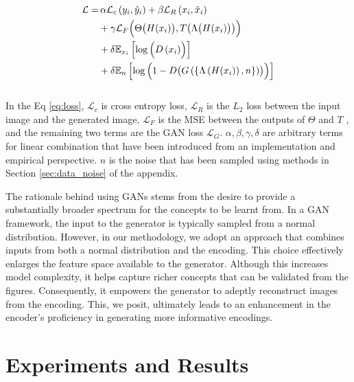 \documentclass[letterpaper]{article}
\begin{document}
\begin{equation}
\begin{aligned}\label{eq:loss}
    \mathcal{L} = & \, \alpha\mathcal{L}_c\left(y_i, \hat{y}_i\right) + \beta \mathcal{L}_R\left(x_i, \hat{x}_i\right)\\
    &+ \gamma \mathcal{L}_F\Bigl(\Theta\bigl(H(x_i)\bigr), T\bigl(\Lambda\bigl(H(x_i)\bigr)\bigr)\Bigr) \\
    & + \delta\mathbb{E}_{x_i}\left[\log\,\Bigl(D\left(x_i\right)\Bigr)\right]\\ &+ \delta\mathbb{E}_{n}\left[\log\,\Bigl(1-D\bigl(G\left(\{\Lambda\left(H(x_i)\right), n\}\right)\bigr)\Bigr)\right]
\end{aligned}
\end{equation}\\

In the Eq \ref{eq:loss}, $\mathcal{L}_c$ is cross entropy loss, $\mathcal{L}_R$ is the $L_2$ loss between the input image and the generated image, $\mathcal{L}_F$ is the MSE between the outputs of $\Theta$ and $T$ \cite{SENN, Sarkar2021AFF, bastani}, and the remaining two terms are the GAN loss $\mathcal{L}_G$. $\alpha, \beta, \gamma, \delta$ are arbitrary terms for linear combination that have been introduced from an implementation and empirical perspective.
$n$ is the noise that has been sampled using methods in Section \ref{sec:data_noise} of the appendix.

The rationale behind using GANs stems from the desire to provide a substantially broader spectrum for the concepts to be learnt from. In a GAN framework, the input to the generator is typically sampled from a normal distribution. However, in our methodology, we adopt an approach that combines inputs from both a normal distribution and the encoding. This choice effectively enlarges the feature space available to the generator. Although this increases model complexity, it helps capture richer concepts that can be validated from the figures. Consequently, it empowers the generator to adeptly reconstruct images from the encoding. This, we posit, ultimately leads to an enhancement in the encoder's proficiency in generating more informative encodings.

\section{Experiments and Results}\label{sec:exp}
\end{document}
